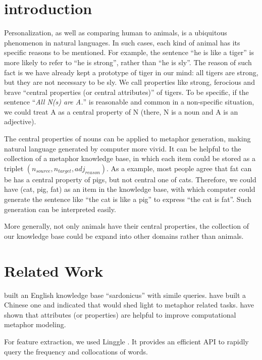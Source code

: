 

\section{introduction}
Personalization, as well as comparing human to animals, is a ubiquitous phenomenon in natural languages. 
In such cases, each kind of animal has its specific reasons to be mentioned. 
For example, the sentence ``he is like a tiger'' is more likely to refer to ``he is strong'', rather than ``he is sly''. 
The reason of such fact is we have already kept a prototype of tiger in our mind: all tigers are strong, but they are not necessary to be sly. 
We call properties like strong, ferocious and brave ``central properties (or central attributes)'' of tigers. To be specific, if the sentence
``{\sl All N(s) are A.}''
is reasonable and common in a non-specific situation, we could treat A as a central property of N (there, N is a noun and A is an adjective).

The central properties of nouns can be applied to metaphor generation, making natural language generated by computer more vivid. It can be helpful to the collection of a metaphor knowledge base, in which each item could be stored as a triplet $(n_{source}, n_{target}, adj_{reason})$.  As a example, most people agree that fat can be has a central property of pigs, but not central one of cats. Therefore, we could have (cat, pig, fat) as an item in the knowledge base, with which computer could generate the sentence like ``the cat is like a pig'' to express ``the cat is fat''. Such generation can be interpreted easily. 

More generally, not only animals have their central properties, the collection of our knowledge base could be expand into other domains rather than animals. 

\section{Related Work}

 built an English knowledge base ``sardonicus'' with simile queries. 
 have built a Chinese one and indicated that would shed light to metaphor related tasks.
 have shown that attributes (or properties) are helpful to improve computational metaphor modeling. 

For feature extraction, we used Linggle \cite{boisson2013linggle}. 
It provides an efficient API to rapidly query the frequency and collocations of words. 

